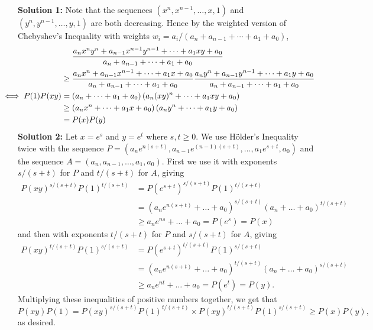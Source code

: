 \documentclass[a4paper,12pt]{article}
\begin{document}
\begin{enumerate}
	\textbf{Solution 1:} Note that the sequences $(x^n, x^{n-1}, \dotsc, x, 1)$ and $(y^n, y^{n-1}, \dotsc, y, 1)$ are both decreasing. Hence by the weighted version of Chebyshev's Inequality with weights $w_i = a_i/(a_n+a_{n-1}+\dotsb+a_1+a_0)$,
	\begin{align*}
		&\mspace{24mu} \frac{a_n x^ny^n +a_{n-1}x^{n-1}y^{n-1} +\dotsb +a_1 xy +a_0}{a_n+a_{n-1} +\dotsb +a_1 +a_0} \\ &\geq \frac{a_n x^n +a_{n-1}x^{n-1} +\dotsb +a_1 x +a_0}{a_n+a_{n-1} +\dotsb +a_1 +a_0} \frac{a_n y^n +a_{n-1}y^{n-1} +\dotsb +a_1 y +a_0}{a_n+a_{n-1} +\dotsb +a_1 +a_0} \\
		\mspace{-36mu} \iff P(1)P(xy) &= \left(a_n +\dotsb +a_1 +a_0\right) \left(a_n(xy)^n +\dotsb +a_1 xy +a_0\right) \\ &\geq \left(a_nx^n +\dotsb +a_1 x +a_0\right) \left(a_ny^n +\dotsb +a_1 y +a_0\right) \\ &= P(x)P(y)
	\end{align*}
	\textbf{Solution 2:} Let $x = e^s$ and $y = e^t$ where $s,t \geq 0$. We use H\"older's Inequality twice with the sequence $P = (a_n e^{n(s+t)}, a_{n-1} e^{(n-1)(s+t)}, \dotsc, a_1 e^{s+t}, a_0)$ and the sequence $A = (a_n, a_{n-1}, \dotsc, a_1, a_0)$. First we use it with exponents $s/(s+t)$ for $P$ and $t/(s+t)$ for $A$, giving \begin{align*} P(xy)^{s/(s+t)} P(1)^{t/(s+t)} &= P\!\left(e^{s+t}\right)^{s/(s+t)} P(1)^{t/(s+t)} \\ &= \left(a_n e^{n(s+t)} +\dotsc +a_0\right)^{s/(s+t)} \left(a_n +\dotsc +a_0\right)^{t/(s+t)} \\ &\geq a_n e^{ns} +\dotsc +a_0 = P(e^s) = P(x)\end{align*} and then with exponents $t/(s+t)$ for $P$ and $s/(s+t)$ for $A$, giving \begin{align*} P(xy)^{t/(s+t)} P(1)^{s/(s+t)} &= P\!\left(e^{s+t}\right)^{t/(s+t)} P(1)^{s/(s+t)} \\ &= \left(a_n e^{n(s+t)} +\dotsc +a_0\right)^{t/(s+t)} \left(a_n +\dotsc +a_0\right)^{s/(s+t)} \\ &\geq a_n e^{nt} +\dotsc +a_0 = P(e^t) = P(y).\end{align*}
	Multiplying these inequalities of positive numbers together, we get that \[P(xy)P(1) = P(xy)^{s/(s+t)} P(1)^{t/(s+t)} \times P(xy)^{t/(s+t)} P(1)^{s/(s+t)} \geq P(x) P(y),\] as desired.

\end{enumerate}
\end{document}
